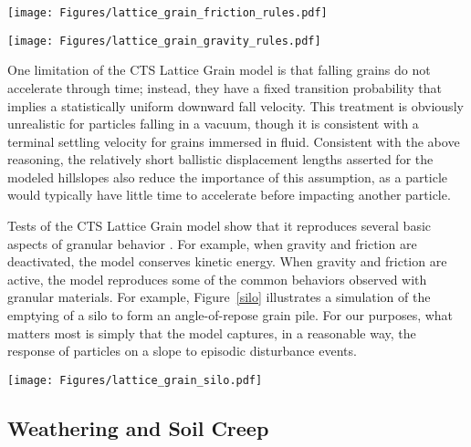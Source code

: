 \documentclass[esurf, manuscript]{copernicus}
\begin{document}
\begin{figure*}[t]
\texttt{[image: Figures/lattice\_grain\_friction\_rules.pdf]}
\caption{Rules for motion and frictional (inelastic) collisions, illustrated here for one of the six lattice directions.}
\label{frictional}
\end{figure*}

\begin{figure*}[t]
\texttt{[image: Figures/lattice\_grain\_gravity\_rules.pdf]}
\caption{Illustration of gravitational rules. The bottom row shows the ``falling on a slope'' rule, which effectively imposes a 30$^\circ$ angle of repose. Modified from \citet{tucker2016celllab}.}
\label{gravity}
\end{figure*}

One limitation of the CTS Lattice Grain model is that falling grains do not accelerate through time; instead, they have a fixed transition probability that implies a statistically uniform downward fall velocity. This treatment is obviously unrealistic for particles falling in a vacuum, though it is consistent with a terminal settling velocity for grains immersed in fluid. Consistent with the above reasoning, the relatively short ballistic displacement lengths asserted for the modeled hillslopes also reduce the importance of this assumption, as a particle would typically have little time to accelerate before impacting another particle.

Tests of the CTS Lattice Grain model show that it reproduces several basic aspects of granular behavior \citep{tucker2016celllab}. For example, when gravity and friction are deactivated, the model conserves kinetic energy. When gravity and friction are active, the model reproduces some of the common behaviors observed with granular materials. For example, Figure~\ref{silo} illustrates a simulation of the emptying of a silo to form an angle-of-repose grain pile. For our purposes, what matters most is simply that the model captures, in a reasonable way, the response of particles on a slope to episodic disturbance events.

\begin{figure*}[t]
\texttt{[image: Figures/lattice\_grain\_silo.pdf]}
\caption{Lattice Grain simulation of emptying of a silo. Light-shaded grains are stationary; darker-shaded ones are in motion. Black cells are walls (rock). From \citet{tucker2016celllab}.}
\label{silo}
\end{figure*}

\subsection{Weathering and Soil Creep}
\end{document}
